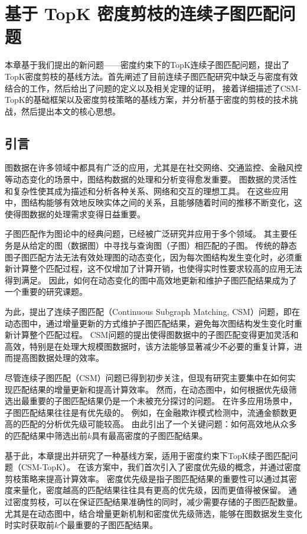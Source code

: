 \chapter{基于 TopK 密度剪枝的连续子图匹配问题}
\label{ch3}
本章基于我们提出的新问题——密度约束下的TopK连续子图匹配问题，提出了TopK密度剪枝的基线方法。首先阐述了目前连续子图匹配研究中缺乏与密度有效结合的工作，然后给出了问题的定义以及相关定理的证明，
接着详细描述了CSM-TopK的基础框架以及密度剪枝策略的基线方案，并分析基于密度的剪枝的技术挑战，然后提出本文的核心思想。
\section{引言}
\label{ch3:introduction}
图数据在许多领域中都具有广泛的应用，尤其是在社交网络、交通监控、金融风控等动态变化的场景中，图结构数据的处理和分析变得愈发重要。
图数据的灵活性和复杂性使其成为描述和分析各种关系、网络和交互的理想工具。
在这些应用中，图结构能够有效地反映实体之间的关系，且能够随着时间的推移不断变化，这使得图数据的处理需求变得日益重要。

子图匹配作为图论中的经典问题，已经被广泛研究并应用于多个领域。
其主要任务是从给定的图（数据图）中寻找与查询图（子图）相匹配的子图。
传统的静态图子图匹配方法无法有效处理图的动态变化，因为每次图结构发生变化时，必须重新计算整个匹配过程，这不仅增加了计算开销，也使得实时性要求较高的应用无法得到满足。
因此，如何在动态变化的图中高效地更新和维护子图匹配结果成为了一个重要的研究课题。

为此，提出了连续子图匹配（Continuous Subgraph Matching, CSM）问题，即在动态图中，通过增量更新的方式维护子图匹配结果，避免每次图结构发生变化时重新计算整个匹配过程。
CSM问题的提出使得图数据中的子图匹配变得更加灵活和高效，特别是在处理大规模图数据时，该方法能够显著减少不必要的重复计算，进而提高图数据处理的效率。

尽管连续子图匹配（CSM）问题已得到初步关注，但现有研究主要集中在如何实现匹配结果的增量更新和提高计算效率。
然而，在动态图中，如何根据优先级筛选出最重要的子图匹配结果仍是一个未被充分探讨的问题。
在许多应用场景中，子图匹配结果往往是有优先级的。
例如，在金融欺诈模式检测中，流通金额数更高的匹配的分析优先级可能较高。
由此引出了一个关键问题：如何高效地从众多的匹配结果中筛选出前$k$具有最高密度的子图匹配结果。

基于此，本章提出并研究了一种基线方案，适用于密度约束下TopK续子图匹配问题（CSM-TopK）。
在该方案中，我们首次引入了密度优先级的概念，并通过密度剪枝策略来提高计算效率。
密度优先级是指子图匹配结果的重要性可以通过其密度来量化，密度越高的匹配结果往往具有更高的优先级，因而更值得被保留。
通过密度剪枝，可以在保证匹配结果准确性的同时，减少需要存储的子图匹配数量。
尤其是在动态图中，结合增量更新机制和密度优先级筛选，能够在图数据发生变化时实时获取前$k$个最重要的子图匹配结果。
